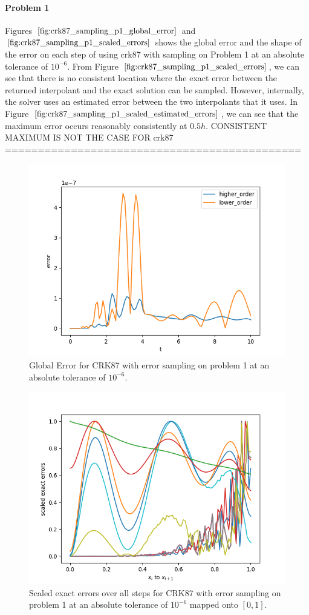 \paragraph{Problem 1} Figures $\ref{fig:crk87_sampling_p1_global_error}$ and $\ref{fig:crk87_sampling_p1_scaled_errors}$ shows the global error and the shape of the error on each step of using crk87 with sampling on Problem 1 at an absolute tolerance of $10^{-6}$. From Figure $\ref{fig:crk87_sampling_p1_scaled_errors}$, we can see that there is no consistent location where the exact error between the returned interpolant and the exact solution can be sampled. However, internally, the solver uses an estimated error between the two interpolants that it uses. In Figure $\ref{fig:crk87_sampling_p1_scaled_estimated_errors}$, we can see that the maximum error occurs reasonably consistently at $0.5h$. CONSISTENT MAXIMUM IS NOT THE CASE FOR crk87 =============================================

\begin{figure}[H]
\centering
\includegraphics[width=0.7\linewidth]{./figures/crk87_sampling_p1_global_error}
\caption{Global Error for CRK87 with error sampling on problem 1 at an absolute tolerance of $10^{-6}$.}
\label{fig:crk87_sampling_p1_global_error}
\end{figure}

\begin{figure}[H]
\centering
\includegraphics[width=0.7\linewidth]{./figures/crk87_sampling_p1_scaled_errors}
\caption{Scaled exact errors over all steps for CRK87 with error sampling on problem 1 at an absolute tolerance of $10^{-6}$ mapped onto $[0, 1]$.}
\label{fig:crk87_sampling_p1_scaled_errors}
\end{figure}

